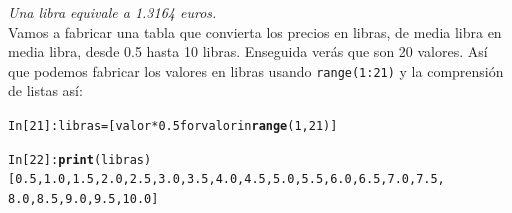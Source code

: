 \documentclass[10pt,a4paper]{article}\usepackage[]{graphicx}\usepackage[]{color}
\makeatletter
\newcommand{\hlkwd}[1]{\textcolor[rgb]{0.737,0.353,0.396}{\textbf{#1}}}%
\newenvironment{kframe}{%
 \def\at@end@of@kframe{}%
 \ifinner\ifhmode%
  \def\at@end@of@kframe{\end{minipage}}%
  \begin{minipage}{\columnwidth}%
 \fi\fi%
 \def\FrameCommand##1{\hskip\@totalleftmargin \hskip-\fboxsep
 \colorbox{shadecolor}{##1}\hskip-\fboxsep
     \hskip-\linewidth \hskip-\@totalleftmargin \hskip\columnwidth}%
 \MakeFramed {\advance\hsize-\width
   \@totalleftmargin\z@ \linewidth\hsize
   \@setminipage}}%
 {\par\unskip\endMakeFramed%
 \at@end@of@kframe}
\newenvironment{knitrout}{}{} %
\makeatother
\begin{document}
{\em Una libra equivale a 1.3164 euros.}\\

Vamos a fabricar una tabla que convierta los precios en libras, de media libra en media libra, desde 0.5 hasta 10 libras. Enseguida verás que son 20 valores. Así que podemos fabricar los valores en libras usando {\tt range(1:21)} y la comprensión de listas así:

\begin{knitrout}
\color{fgcolor}\begin{kframe}
\begin{alltt}
In [21]: libras = [valor * 0.5 for valor in \hlkwd{range}(1, 21)]

In [22]: \hlkwd{print}(libras)
[0.5, 1.0, 1.5, 2.0, 2.5, 3.0, 3.5, 4.0, 4.5, 5.0, 5.5, 6.0, 6.5, 7.0, 7.5,
8.0, 8.5, 9.0, 9.5, 10.0]
\end{alltt}
\end{kframe}
\end{knitrout}
\end{document}
